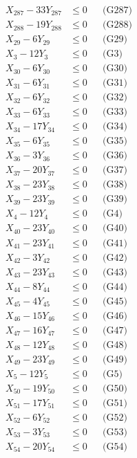 \documentclass[a4paper,10pt]{article}
\begin{document}
{\begin{align}
X_{287} - 33Y_{287} &\leq 0 && \text{(G287)} \\
X_{288} - 19Y_{288} &\leq 0 && \text{(G288)} \\
X_{29} - 6Y_{29} &\leq 0 && \text{(G29)} \\
X_{3} - 12Y_{3} &\leq 0 && \text{(G3)} \\
X_{30} - 6Y_{30} &\leq 0 && \text{(G30)} \\
X_{31} - 6Y_{31} &\leq 0 && \text{(G31)} \\
X_{32} - 6Y_{32} &\leq 0 && \text{(G32)} \\
X_{33} - 6Y_{33} &\leq 0 && \text{(G33)} \\
X_{34} - 17Y_{34} &\leq 0 && \text{(G34)} \\
X_{35} - 6Y_{35} &\leq 0 && \text{(G35)} \\
X_{36} - 3Y_{36} &\leq 0 && \text{(G36)} \\
\allowbreak
X_{37} - 20Y_{37} &\leq 0 && \text{(G37)} \\
X_{38} - 23Y_{38} &\leq 0 && \text{(G38)} \\
X_{39} - 23Y_{39} &\leq 0 && \text{(G39)} \\
X_{4} - 12Y_{4} &\leq 0 && \text{(G4)} \\
X_{40} - 23Y_{40} &\leq 0 && \text{(G40)} \\
X_{41} - 23Y_{41} &\leq 0 && \text{(G41)} \\
X_{42} - 3Y_{42} &\leq 0 && \text{(G42)} \\
X_{43} - 23Y_{43} &\leq 0 && \text{(G43)} \\
X_{44} - 8Y_{44} &\leq 0 && \text{(G44)} \\
X_{45} - 4Y_{45} &\leq 0 && \text{(G45)} \\
X_{46} - 15Y_{46} &\leq 0 && \text{(G46)} \\
X_{47} - 16Y_{47} &\leq 0 && \text{(G47)} \\
X_{48} - 12Y_{48} &\leq 0 && \text{(G48)} \\
X_{49} - 23Y_{49} &\leq 0 && \text{(G49)} \\
X_{5} - 12Y_{5} &\leq 0 && \text{(G5)} \\
X_{50} - 19Y_{50} &\leq 0 && \text{(G50)} \\
X_{51} - 17Y_{51} &\leq 0 && \text{(G51)} \\
X_{52} - 6Y_{52} &\leq 0 && \text{(G52)} \\
X_{53} - 3Y_{53} &\leq 0 && \text{(G53)} \\
X_{54} - 20Y_{54} &\leq 0 && \text{(G54)} \\

\end{align}}
\end{document}
